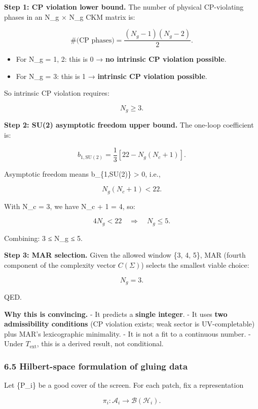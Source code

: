 \documentclass[
]{article}
\providecommand{\tightlist}{%
  \setlength{\itemsep}{0pt}\setlength{\parskip}{0pt}}
\begin{document}
\textbf{Step 1: CP violation lower bound.} The number of physical
CP-violating phases in an N\_g × N\_g CKM matrix is:

\[
\#\text{(CP phases)} = \frac{(N_g - 1)(N_g - 2)}{2}.
\]

\begin{itemize}
\tightlist
\item
  For N\_g = 1, 2: this is 0 → \textbf{no intrinsic CP violation
  possible}.
\item
  For N\_g = 3: this is 1 → \textbf{intrinsic CP violation possible}.
\end{itemize}

So intrinsic CP violation requires:

\[
N_g \ge 3.
\]

\textbf{Step 2: SU(2) asymptotic freedom upper bound.} The one-loop
coefficient is:

\[
b_{1,\mathrm{SU}(2)} = \frac{1}{3}\left[22 - N_g(N_c + 1)\right].
\]

Asymptotic freedom means b\_\{1,SU(2)\} \textgreater{} 0, i.e.,

\[
N_g(N_c + 1) < 22.
\]

With N\_c = 3, we have N\_c + 1 = 4, so:

\[
4 N_g < 22 \quad \Rightarrow \quad N_g \le 5.
\]

Combining: 3 ≤ N\_g ≤ 5.

\textbf{Step 3: MAR selection.} Given the allowed window \{3, 4, 5\},
MAR (fourth component of the complexity vector \(C(\Sigma)\)) selects
the smallest viable choice:

\[
N_g = 3.
\]

QED.

\textbf{Why this is convincing.} - It predicts a \textbf{single
integer}. - It uses \textbf{two admissibility conditions} (CP violation
exists; weak sector is UV-completable) plus MAR's lexicographic
minimality. - It is not a fit to a continuous number. - Under
\(T_{\mathrm{ext}}\), this is a derived result, not conditional.

\subsubsection{6.5 Hilbert-space formulation of gluing
data}\label{hilbert-space-formulation-of-gluing-data}

Let \{P\_i\} be a good cover of the screen. For each patch, fix a
representation

\[
\pi_i: \mathcal{A}_i \to \mathcal B(\mathcal H_i).
\]
\end{document}

